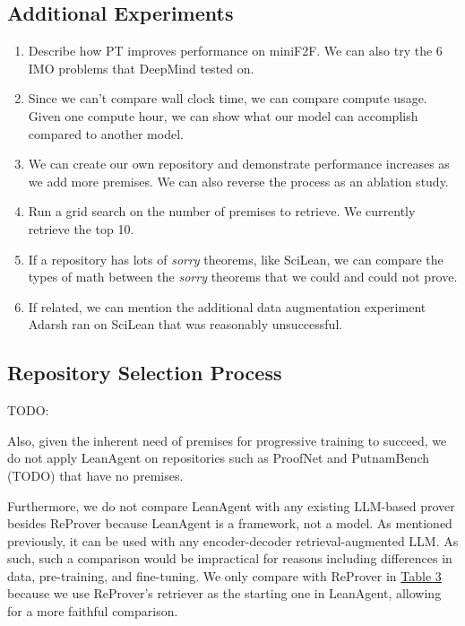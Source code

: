 \documentclass{article} %
\begin{document}


\subsection{Additional Experiments}

\begin{enumerate}
    \item Describe how PT improves performance on miniF2F. We can also try the 6 IMO problems that DeepMind tested on.
    \item Since we can’t compare wall clock time, we can compare compute usage. Given one compute hour, we can show what our model can accomplish compared to another model.
    \item We can create our own repository and demonstrate performance increases as we add more premises. We can also reverse the process as an ablation study.
    \item Run a grid search on the number of premises to retrieve. We currently retrieve the top 10.
    \item If a repository has lots of \textit{sorry} theorems, like SciLean, we can compare the types of math between the \textit{sorry} theorems that we could and could not prove.
    \item If related, we can mention the additional data augmentation experiment Adarsh ran on SciLean that was reasonably unsuccessful.
\end{enumerate}

\subsection{Repository Selection Process}

TODO:

Also, given the inherent need of premises for progressive training to succeed, we do not apply LeanAgent on repositories such as ProofNet and PutnamBench (TODO) that have no premises.

Furthermore, we do not compare LeanAgent with any existing LLM-based prover besides ReProver because LeanAgent is a framework, not a model. As mentioned previously, it can be used with any encoder-decoder retrieval-augmented LLM. As such, such a comparison would be impractical for reasons including differences in data, pre-training, and fine-tuning. We only compare with ReProver in \hyperref[tab:theorem-proofs]{Table 3} because we use ReProver's retriever as the starting one in LeanAgent, allowing for a more faithful comparison.
\end{document}
